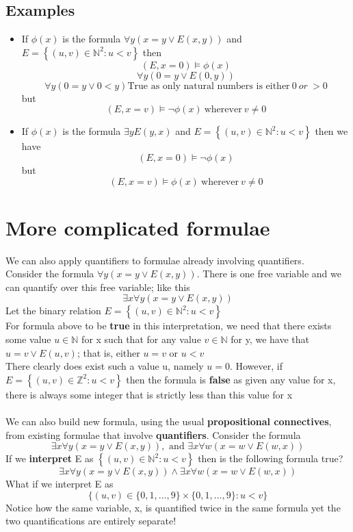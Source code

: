 \documentclass{article}[18pt]
\begin{document}
\subsection{Examples}
\begin{itemize}
\item If $\phi(x)$ is the formula $\forall y(x=y \lor E(x,y))$ and $E = \left\{ ( u , v ) \in \mathbb { N } ^ { 2 } : u < v \right\}$ then
$$( E , x = 0 ) \models \phi ( x )$$
$$\forall y (0=y \lor E(0,y))$$
$$\forall y (0=y \lor 0<y) \text{True as only natural numbers is either} \ 0 \ or \ >0$$
but
$$(E,x=v)\models \lnot\phi (x) \ \text{wherever} \ v\neq 0$$
\item If $\phi(x)$ is the formula $\exists y E(y,x)$ and $E = \left\{ ( u , v ) \in \mathbb { N } ^ { 2 } : u < v \right\}$ then we have
$$(E,x=0)\models \lnot \phi (x)$$
but
$$(E,x=v)\models \phi (x) \ \text{wherever} \  v\neq 0$$
\end{itemize}
\section{More complicated formulae}
We can also apply quantifiers to formulae already involving quantifiers.\\
Consider the formula $\forall y(x=y \lor E(x,y))$. There is one free variable and we can quantify over this free variable; like this
$$\exists x \forall y ( x = y \vee E ( x , y ) )$$
Let the binary relation $E = \left\{ ( u , v ) \in \mathbb { N } ^ { 2 } : u < v \right\}$\\
For formula above to be \textbf{true} in this interpretation, we need that there exists some value $u\in \mathbb{ N }$ for x such that for any value $v\in \mathbb{ N }$ for y, we have that $u=v\lor E(u,v)$; that is, either $u=v$ or $u<v$\\
There clearly does exist such a value u, namely $u=0$. However, if $E = \left\{ ( u , v ) \in \mathbb { Z } ^ { 2 } : u < v \right\}$ then the formula is \textbf{false} as given any value for x, there is always some integer that is strictly less than this value for x\\
\\
We can also build new formula, using the usual \textbf{propositional connectives}, from existing formulae that involve \textbf{quantifiers}. Consider the formula
$$\exists x \forall y ( x = y \vee E ( x , y ) ) , \text { and } \exists x \forall w ( x = w \vee E ( w , x ) )$$
If we \textbf{interpret} E as $\left\{ ( u , v ) \in \mathbb { N } ^ { 2 } : u < v \right\}$ then is the following formula true?
$$\exists x \forall y ( x = y \vee E ( x , y ) ) \wedge \exists x \forall w ( x = w \vee E ( w , x ) )$$
What if we interpret E as
$$\{ ( u , v ) \in \{ 0,1 , \ldots , 9 \} \times \{ 0,1 , \ldots , 9 \} : u < v \}$$
Notice how the same variable, x, is quantified twice in the same formula yet the two quantifications are entirely separate!
\end{document}
